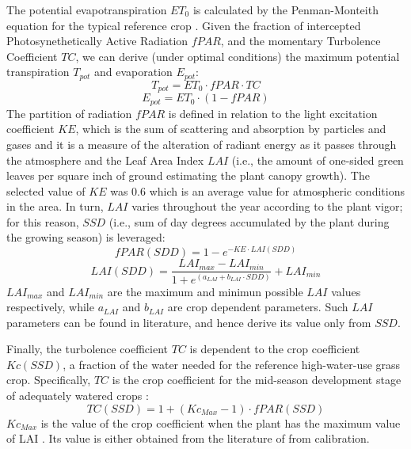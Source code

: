 The potential evapotranspiration $ET_0$ is calculated by the Penman-Monteith equation for the typical reference crop \cite{allen-etal-1988}.
Given the fraction of intercepted Photosynethetically Active Radiation $fPAR$, and the momentary Turbolence Coefficient $TC$, we can derive (under optimal conditions) the maximum potential transpiration $T_{pot}$ and evaporation $E_{pot}$:
%
\begin{equation}
\label{maxET}
T_{pot} = ET_0 \cdot fPAR \cdot TC
\end{equation}
\begin{equation}
\label{minET}
E_{pot}= ET_0 \cdot (1-fPAR)
\end{equation}
%
The partition of radiation $fPAR$ is defined in relation to the light excitation coefficient $KE$, which is the sum of scattering and absorption by particles and gases and it is a measure of the alteration of radiant energy as it passes through the atmosphere and the Leaf Area Index $LAI$ (i.e., the amount of one-sided green leaves per square inch of ground estimating the plant canopy growth).
The selected value of $KE$ was 0.6 which is an average value for atmospheric conditions in the area.
In turn, $LAI$ varies throughout the year according to the plant vigor; for this reason, $SSD$ (i.e., sum of day degrees accumulated by the plant during the growing season) is leveraged:
%
\begin{equation}
\label{fPARi}
fPAR(SDD) = 1- e^ {-KE \cdot LAI(SDD)}
\end{equation}
\begin{equation}
\label{LAI}
LAI(SDD) = \frac{LAI_{max}-LAI_{min}}{1+e^{(a_{LAI}+b_{LAI}\cdot SDD)}}+ LAI_{min}
\end{equation}
$LAI_{max}$ and $LAI_{min}$ are the maximum and minimun possible $LAI$ values respectively, while $a_{LAI}$ and $b_{LAI}$ are crop dependent parameters. Such $LAI$ parameters can be found in literature, and hence derive its value only from $SSD$.

Finally, the turbolence coefficient $TC$ is dependent to the crop coefficient $Kc(SSD)$, a fraction of the water needed for the reference high-water-use grass crop.
Specifically, $TC$ is the crop coefficient for the mid-season development stage of adequately watered crops \cite{driessen1992land}:
\begin{equation}
\label{TC} TC(SSD) = 1 + (Kc_{Max}-1) \cdot fPAR(SSD)
\end{equation}
$Kc_{Max}$ is the value of the crop coefficient when the plant has the maximum value of LAI \cite{allen-etal-1988}.
Its value is either obtained from the literature of from calibration.



